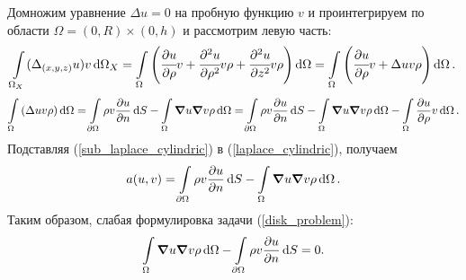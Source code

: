 \documentclass{report}
\begin{document}
Домножим уравнение $\Delta u = 0$ на пробную функцию $v$ и проинтегрируем по области $\Omega = (0,R)\times(0,h)$ и рассмотрим левую часть:
\begin{equation}\label{laplace_cylindric}
	\int\limits_{\Omega_{X}} (\Delta_{(x,y,z)} u) v \dd{\Omega_{X}} = \int\limits_{\Omega} \left( \cfrac{\partial u}{\partial \rho}v + \cfrac{\partial^2u}{\partial \rho^2}v\rho + \cfrac{\partial^2u}{\partial z^2}v\rho \right) \dd{\Omega} = \int\limits_{\Omega} \left( \cfrac{\partial u}{\partial \rho}v + \Delta u v\rho \right) \dd{\Omega}.
\end{equation}
\begin{equation}\label{sub_laplace_cylindric}
	\int\limits_{\Omega} \left( \Delta u v\rho \right) \dd{\Omega} = \int\limits_{\partial \Omega}\rho v \pdv{u}{n}\dd{S}-\int\limits_{\Omega}\grad{u}\grad{v\rho}\dd{\Omega}=\int\limits_{\partial \Omega}\rho v \pdv{u}{n}\dd{S}-\int\limits_{\Omega}\grad{u}\grad{v}\rho\dd{\Omega}-\int\limits_{\Omega}\pdv{u}{\rho}v\dd{\Omega}.
\end{equation}
Подставляя (\ref{sub_laplace_cylindric}) в (\ref{laplace_cylindric}), получаем
\begin{equation}
	a(u,v)=\int\limits_{\partial \Omega}\rho v \pdv{u}{n}\dd{S}-\int\limits_{\Omega}\grad{u}\grad{v}\rho\dd{\Omega}.
\end{equation}
Таким образом, слабая формулировка задачи (\ref{disk_problem}):
\begin{equation}\label{disk_weak}
	\int\limits_{\Omega}\grad{u}\grad{v}\rho\dd{\Omega}-\int\limits_{\partial \Omega}\rho v \pdv{u}{n}\dd{S}=0.
\end{equation}
\end{document}

